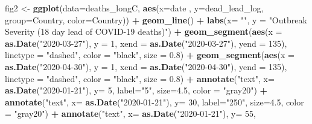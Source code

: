 \documentclass[
]{article}
\newenvironment{Shaded}{\begin{snugshade}}{\end{snugshade}}
\newcommand{\DataTypeTok}[1]{\textcolor[rgb]{0.13,0.29,0.53}{#1}}
\newcommand{\DecValTok}[1]{\textcolor[rgb]{0.00,0.00,0.81}{#1}}
\newcommand{\FloatTok}[1]{\textcolor[rgb]{0.00,0.00,0.81}{#1}}
\newcommand{\KeywordTok}[1]{\textcolor[rgb]{0.13,0.29,0.53}{\textbf{#1}}}
\newcommand{\NormalTok}[1]{#1}
\newcommand{\OperatorTok}[1]{\textcolor[rgb]{0.81,0.36,0.00}{\textbf{#1}}}
\newcommand{\StringTok}[1]{\textcolor[rgb]{0.31,0.60,0.02}{#1}}
\begin{document}
\begin{Shaded}
\begin{Highlighting}[]
{{{\NormalTok{fig2 <-}\StringTok{ }\KeywordTok{ggplot}\NormalTok{(}\DataTypeTok{data=}\NormalTok{deaths_longC, }\KeywordTok{aes}\NormalTok{(}\DataTypeTok{x=}\NormalTok{date , }\DataTypeTok{y=}\NormalTok{dead_lead_log, }\DataTypeTok{group=}\NormalTok{Country, }\DataTypeTok{color=}\NormalTok{Country)) }\OperatorTok{+}
\StringTok{    }\KeywordTok{geom_line}\NormalTok{() }\OperatorTok{+}
\StringTok{  }\KeywordTok{labs}\NormalTok{(}\DataTypeTok{x=} \StringTok{""}\NormalTok{, }\DataTypeTok{y =} \StringTok{"Outbreak Severity (18 day lead of COVID-19 deaths)"}\NormalTok{) }\OperatorTok{+}
\StringTok{  }\KeywordTok{geom_segment}\NormalTok{(}\KeywordTok{aes}\NormalTok{(}\DataTypeTok{x =} \KeywordTok{as.Date}\NormalTok{(}\StringTok{"2020-03-27"}\NormalTok{), }\DataTypeTok{y =} \DecValTok{1}\NormalTok{, }\DataTypeTok{xend =} \KeywordTok{as.Date}\NormalTok{(}\StringTok{"2020-03-27"}\NormalTok{), }\DataTypeTok{yend =} \DecValTok{135}\NormalTok{), }\DataTypeTok{linetype =} \StringTok{"dashed"}\NormalTok{, }\DataTypeTok{color =} \StringTok{"black"}\NormalTok{, }\DataTypeTok{size =} \FloatTok{0.8}\NormalTok{) }\OperatorTok{+}
\StringTok{  }\KeywordTok{geom_segment}\NormalTok{(}\KeywordTok{aes}\NormalTok{(}\DataTypeTok{x =} \KeywordTok{as.Date}\NormalTok{(}\StringTok{"2020-04-30"}\NormalTok{), }\DataTypeTok{y =} \DecValTok{1}\NormalTok{, }\DataTypeTok{xend =} \KeywordTok{as.Date}\NormalTok{(}\StringTok{"2020-04-30"}\NormalTok{), }\DataTypeTok{yend =} \DecValTok{135}\NormalTok{), }\DataTypeTok{linetype =} \StringTok{"dashed"}\NormalTok{, }\DataTypeTok{color =} \StringTok{"black"}\NormalTok{, }\DataTypeTok{size =} \FloatTok{0.8}\NormalTok{) }\OperatorTok{+}
\StringTok{  }\KeywordTok{annotate}\NormalTok{(}\StringTok{"text"}\NormalTok{, }\DataTypeTok{x=} \KeywordTok{as.Date}\NormalTok{(}\StringTok{"2020-01-21"}\NormalTok{), }\DataTypeTok{y=} \DecValTok{5}\NormalTok{, }
           \DataTypeTok{label=}\StringTok{"5"}\NormalTok{, }\DataTypeTok{size=}\FloatTok{4.5}\NormalTok{, }\DataTypeTok{color =} \StringTok{"gray20"}\NormalTok{) }\OperatorTok{+}
\StringTok{  }\KeywordTok{annotate}\NormalTok{(}\StringTok{"text"}\NormalTok{, }\DataTypeTok{x=} \KeywordTok{as.Date}\NormalTok{(}\StringTok{"2020-01-21"}\NormalTok{), }\DataTypeTok{y=} \DecValTok{30}\NormalTok{, }
           \DataTypeTok{label=}\StringTok{"250"}\NormalTok{, }\DataTypeTok{size=}\FloatTok{4.5}\NormalTok{, }\DataTypeTok{color =} \StringTok{"gray20"}\NormalTok{) }\OperatorTok{+}
\StringTok{  }\KeywordTok{annotate}\NormalTok{(}\StringTok{"text"}\NormalTok{, }\DataTypeTok{x=} \KeywordTok{as.Date}\NormalTok{(}\StringTok{"2020-01-21"}\NormalTok{), }\DataTypeTok{y=} \DecValTok{55}\NormalTok{, }
}}}
\end{Highlighting}
\end{Shaded}
\end{document}
